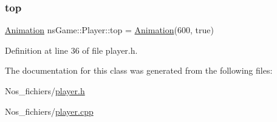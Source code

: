 \subsubsection{\texorpdfstring{top}{top}}
{\footnotesize\ttfamily \hyperlink{classns_game_1_1_animation}{Animation} ns\+Game\+::\+Player\+::top = \hyperlink{classns_game_1_1_animation}{Animation}(600, true)}



Definition at line 36 of file player.\+h.



The documentation for this class was generated from the following files\+:\begin{DoxyCompactItemize}
\item 
Nos\+\_\+fichiers/\hyperlink{player_8h}{player.\+h}\item 
Nos\+\_\+fichiers/\hyperlink{player_8cpp}{player.\+cpp}\end{DoxyCompactItemize}
